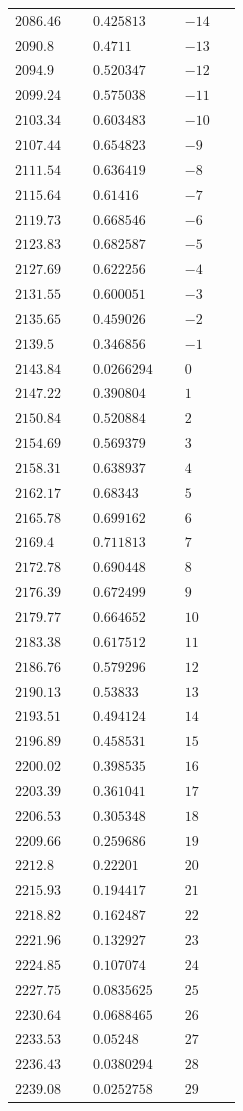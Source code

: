 \begin{table}[H]
\centering

	\begin{tabular}{C{0.15\linewidth}|C{0.15\linewidth}|C{0.15\linewidth}}
$2086.46$&	$0.425813$&	$-14$\\
$2090.8$&	$0.4711$&	$-13$\\
$2094.9$&	$0.520347$&	$-12$\\
$2099.24$&	$0.575038$&	$-11$\\
$2103.34$&	$0.603483$&	$-10$\\
$2107.44$&	$0.654823$&	$-9$\\
$2111.54$&	$0.636419$&	$-8$\\
$2115.64$&	$0.61416$&	$-7$\\
$2119.73$&	$0.668546$&	$-6$\\
$2123.83$&	$0.682587$&	$-5$\\
$2127.69$&	$0.622256$&	$-4$\\
$2131.55$&	$0.600051$&	$-3$\\
$2135.65$&	$0.459026$&	$-2$\\
$2139.5$&	$0.346856$&	$-1$\\
$2143.84$&	$0.0266294$&	$0$\\
$2147.22$&	$0.390804$&	$1$\\
$2150.84$&	$0.520884$&	$2$\\
$2154.69$&	$0.569379$&	$3$\\
$2158.31$&	$0.638937$&	$4$\\
$2162.17$&	$0.68343$&	$5$\\
$2165.78$&	$0.699162$&	$6$\\
$2169.4$&	$0.711813$&	$7$\\
$2172.78$&	$0.690448$&	$8$\\
$2176.39$&	$0.672499$&	$9$\\
$2179.77$&	$0.664652$&	$10$\\
$2183.38$&	$0.617512$&	$11$\\
$2186.76$&	$0.579296$&	$12$\\
$2190.13$&	$0.53833$&	$13$\\
$2193.51$&	$0.494124$&	$14$\\
$2196.89$&	$0.458531$&	$15$\\
$2200.02$&	$0.398535$&	$16$\\
$2203.39$&	$0.361041$&	$17$\\
$2206.53$&	$0.305348$&	$18$\\
$2209.66$&	$0.259686$&	$19$\\
$2212.8$&	$0.22201$&	$20$\\
$2215.93$&	$0.194417$&	$21$\\
$2218.82$&	$0.162487$&	$22$\\
$2221.96$&	$0.132927$&	$23$\\
$2224.85$&	$0.107074$&	$24$\\
$2227.75$&	$0.0835625$&	$25$\\
$2230.64$&	$0.0688465$&	$26$\\
$2233.53$&	$0.05248$&	$27$\\
$2236.43$&	$0.0380294$&	$28$\\
$2239.08$&	$0.0252758$&	$29$\\


\end{tabular}
\end{table}
